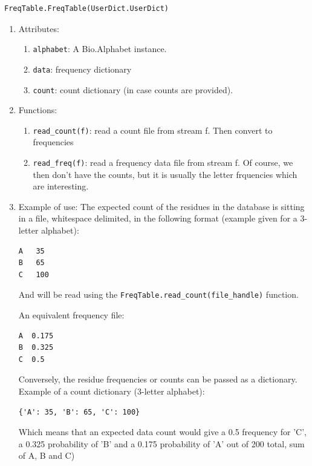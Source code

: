 \documentclass{report}
\begin{document}
\begin{verbatim}
FreqTable.FreqTable(UserDict.UserDict)
\end{verbatim}

\begin{enumerate}

  \item Attributes:
 

  \begin{enumerate}
    \item \verb|alphabet|: A Bio.Alphabet instance.
    \item \verb|data|: frequency dictionary
    \item \verb|count|: count dictionary (in case counts are provided).
  \end{enumerate}

  \item Functions:
  \begin{enumerate}
    \item \verb|read_count(f)|: read a count file from stream f. Then convert to frequencies
    \item \verb|read_freq(f)|: read a frequency data file from stream f. Of course, we then don't have the counts, but it is usually the letter frquencies which are interesting.
  \end{enumerate}

  \item Example of use:
  The expected count of the residues in the database is sitting in a file, whitespace delimited, in the following format (example given for a 3-letter alphabet):

\begin{verbatim}
A   35
B   65
C   100
\end{verbatim}

And will be read using the \verb|FreqTable.read_count(file_handle)| function.

An equivalent frequency file:

\begin{verbatim}
A  0.175
B  0.325
C  0.5
\end{verbatim}

Conversely, the residue frequencies or counts can be passed as a dictionary.
Example of a count dictionary (3-letter alphabet):

\begin{verbatim}
{'A': 35, 'B': 65, 'C': 100}
\end{verbatim}

Which means that an expected data count would give a 0.5 frequency
for 'C', a 0.325 probability of 'B' and a 0.175 probability of 'A'
out of 200 total, sum of A, B and C)


\end{enumerate}
\end{document}
